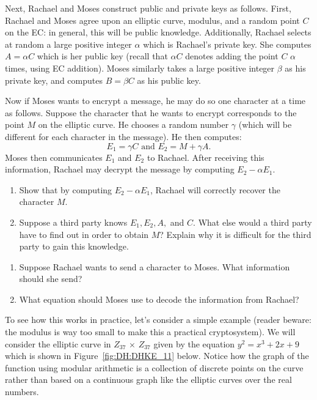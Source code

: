 Next, Rachael and Moses construct public and private keys as follows. First, Rachael and Moses agree upon an elliptic curve, modulus, and a random point $C$ on the EC: in general, this will be public knowledge.  Additionally, Rachael selects at  random a large positive integer $\alpha$ which is  Rachael's private key. She computes $A = \alpha C$ which is her public key (recall that $\alpha C$ denotes adding the point $C$ $\alpha$ times, using EC addition). Moses similarly takes a large positive integer $\beta$ as his private key, and computes $B = \beta C$ as his public key.

Now if Moses wants to encrypt a message, he may do so one character at a time as follows. Suppose the character that he wants to encrypt corresponds to the point $M$ on the elliptic curve.   He chooses a random number $\gamma$ (which will be different for each character in the message). He then computes:
\[
E_1=\gamma C \text{   and   }
E_2 = M +  \gamma A. 
\]
Moses then communicates $E_1$ and $E_2$ to  Rachael.  After receiving this information, Rachael may decrypt the message by computing $E_2 - \alpha E_1$.

\begin{exercise}\label{exercise:further_crypt:}
\begin{enumerate}[a]
\item
Show that by computing $E_2 - \alpha E_1$, Rachael will correctly recover  the character $M$.
\item
Suppose a third party knows $E_1, E_2, A,$ and $C$. What else would a third party have to find out in order to obtain $M$?  Explain why it is difficult for the third party to gain this knowledge.
\end{enumerate}
\end{exercise}

\begin{exercise}\label{exercise:further_crypt:}
\begin{enumerate}[a]
\item
Suppose Rachael wants to send a character to Moses.  What information should she send?
\item
What equation should Moses use to decode the information from Rachael?
\end{enumerate}
\end{exercise}

To see how this works in practice, let's consider a simple example (reader beware: the modulus is way too small to make this a practical cryptosystem). We will consider the elliptic curve in $Z_{37}$ $\times$ $Z_{37}$ given by the equation $y^2 = x^3 + 2x + 9$ which is shown in Figure~\ref{fig:DH:DHKE_11} below. Notice how the graph of the function using modular arithmetic is a collection of discrete points on the curve rather than based on a continuous graph like the elliptic curves over the real numbers.


